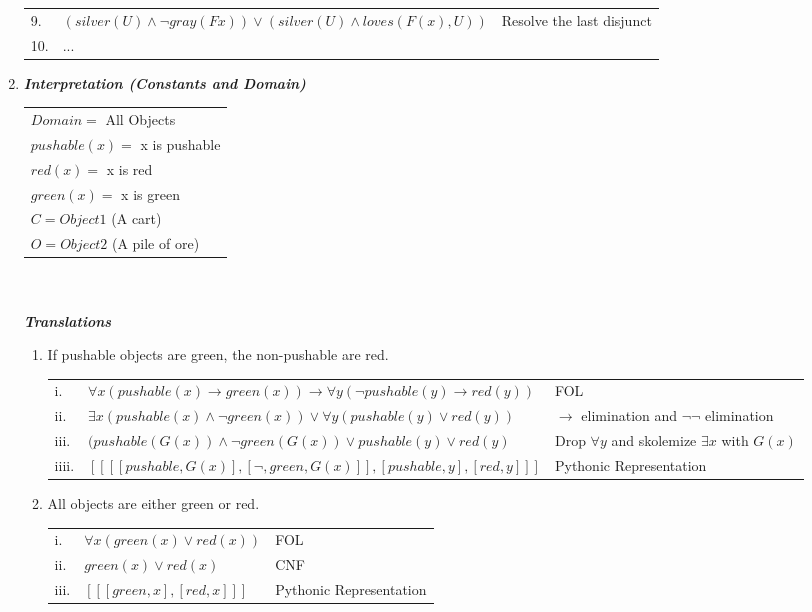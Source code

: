 \documentclass{article}
\begin{document}
\begin{enumerate}
\begin{tabular}{lll}
        9. & $(silver(U) \wedge \neg gray(Fx)) \vee (silver(U) \wedge loves(F(x), U))$ & Resolve the last disjunct\\
        10. & ... &\\
    \end{tabular}
    \pagebreak
    \item %
    \textit{\textbf{Interpretation (Constants and Domain)}}\\
    \begin{tabular}{l}
        $Domain =$ All Objects\\
        $pushable(x) =$ x is pushable\\
        $red(x) =$ x is red\\
        $green(x) =$ x is green\\
        $C = Object 1$ (A cart)\\
        $O = Object 2$ (A pile of ore)\\
    \end{tabular}\\\\
    \textit{\textbf{Translations}}
    \begin{enumerate}
        \item If pushable objects are green, the non-pushable are red.\\
        \begin{tabular}{lll}
            i. & $\forall x (pushable(x) \rightarrow green(x)) \rightarrow \forall y (\neg pushable(y) \rightarrow red(y))$ & FOL\\
            ii. & $\exists x(pushable(x) \wedge \neg green(x)) \vee \forall y(pushable(y) \vee red(y))$ & $\rightarrow$ elimination and $\neg\neg$ elimination\\
            iii. & $(pushable(G(x)) \wedge \neg green(G(x)) \vee pushable(y) \vee red(y)$& Drop $\forall y$ and skolemize $\exists x$ with $G(x)$\\
            iiii. & $[[[[pushable, G(x)], [\neg, green, G(x)]], [pushable,y], [red,y]]]$ & Pythonic Representation\\
        \end{tabular}
        \item All objects are either green or red.\\
        \begin{tabular}{lll}
            i. & $\forall x (green(x) \vee red(x))$ & FOL\\
            ii. & $green(x) \vee red(x)$ & CNF\\
            iii. & $[[[green,x],[red,x]]]$  & Pythonic Representation\\

\end{tabular}
\end{enumerate}
\end{enumerate}
\end{document}
